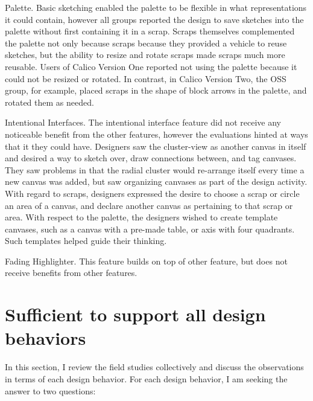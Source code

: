 Palette. Basic sketching enabled the palette to be flexible in what representations it could contain, however all groups reported the design to save sketches into the palette without first containing it in a scrap. Scraps themselves complemented the palette not only because scraps because they provided a vehicle to reuse sketches, but the ability to resize and rotate scraps made scraps much more reusable. Users of Calico Version One reported not using the palette because it could not be resized or rotated. In contrast, in Calico Version Two, the OSS group, for example, placed scraps in the shape of block arrows in the palette, and rotated them as needed. 

Intentional Interfaces. The intentional interface feature did not receive any noticeable benefit from the other features, however the evaluations hinted at ways that it they could have. Designers saw the cluster-view as another canvas in itself and desired a way to sketch over, draw connections between, and tag canvases. They saw problems in that the radial cluster would re-arrange itself every time a new canvas was added, but saw organizing canvases as part of the design activity. With regard to scraps, designers expressed the desire to choose a scrap or circle an area of a canvas, and declare another canvas as pertaining to that scrap or area. With respect to the palette, the designers wished to create template canvases, such as a canvas with a pre-made table, or axis with four quadrants. Such templates helped guide their thinking. 

Fading Highlighter. This feature builds on top of other feature, but does not receive benefits from other features.

%
%
%

\section{Sufficient to support all design behaviors}
\label{chapter:discussion:design-behaviors}

In this section, I review the field studies collectively and discuss the observations in terms of each design behavior. For each design behavior, I am seeking the answer to two questions:

